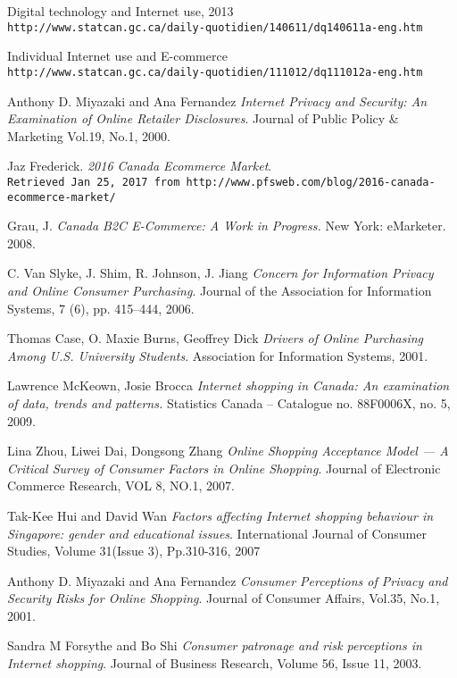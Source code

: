 \documentclass[11pt,twoside]{article}
\begin{document}
\begin{thebibliography}{9}
Digital technology and Internet use, 2013
\\\texttt{http://www.statcan.gc.ca/daily-quotidien/140611/dq140611a-eng.htm}

Individual Internet use and E-commerce
\\\texttt{http://www.statcan.gc.ca/daily-quotidien/111012/dq111012a-eng.htm}

Anthony D. Miyazaki and Ana Fernandez
\textit{Internet Privacy and Security: An Examination of Online Retailer Disclosures}.
Journal of Public Policy \& Marketing Vol.19, No.1, 2000.

Jaz Frederick.
\textit{2016 Canada Ecommerce Market}.
\\\texttt{Retrieved Jan 25, 2017 from http://www.pfsweb.com/blog/2016-canada-ecommerce-market/}

Grau, J.
\textit{Canada B2C E-Commerce: A Work in Progress.}
New York: eMarketer. 2008.

C. Van Slyke, J. Shim, R. Johnson, J. Jiang
\textit{Concern for Information Privacy and Online Consumer Purchasing}.
Journal of the Association for Information Systems, 7 (6), pp. 415–444, 2006.

Thomas Case, O. Maxie Burns, Geoffrey Dick
\textit{Drivers of Online Purchasing Among U.S. University Students}.
Association for Information Systems, 2001.

Lawrence McKeown, Josie Brocca
\textit{Internet shopping in Canada: An examination of data, trends and patterns.}
Statistics Canada – Catalogue no. 88F0006X, no. 5, 2009.

Lina Zhou, Liwei Dai, Dongsong Zhang
\textit{Online Shopping Acceptance Model — A Critical Survey of Consumer Factors in Online Shopping}.
Journal of Electronic Commerce Research, VOL 8, NO.1, 2007.

Tak-Kee Hui and David Wan
\textit{Factors affecting Internet shopping behaviour in Singapore: gender and educational issues}.
International Journal of Consumer Studies, Volume 31(Issue 3), Pp.310-316, 2007

Anthony D. Miyazaki and Ana Fernandez
\textit{Consumer Perceptions of Privacy and Security Risks for Online Shopping}.
Journal of Consumer Affairs, Vol.35, No.1, 2001.

Sandra M Forsythe and Bo Shi
\textit{Consumer patronage and risk perceptions in Internet shopping}.
Journal of Business Research, Volume 56, Issue 11, 2003.
\end{thebibliography}
\end{document}
